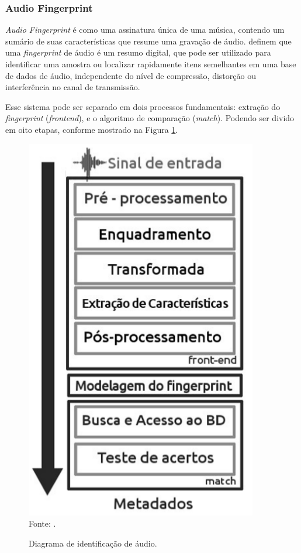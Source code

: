 \subsubsection{Audio Fingerprint} \label{audioFingerprint}
\textit{Audio Fingerprint} é como uma assinatura única de uma música, contendo um sumário de suas características que resume uma gravação de áudio.  definem que uma \textit{fingerprint} de áudio é um resumo digital, que pode ser utilizado para identificar uma amostra ou localizar rapidamente itens semelhantes em uma base de dados de áudio, independente do nível de compressão, distorção ou interferência no canal de transmissão.

Esse sistema pode ser separado em dois processos fundamentais: extração do \textit{fingerprint} (\textit{frontend}), e o algoritmo de comparação (\textit{match}). Podendo ser divido em oito etapas, conforme mostrado na Figura \ref{fig:etapasFinger}.

\begin{figure}[!htb]
   \centering
   \caption{Diagrama de identificação de áudio.}\label{fig:etapasFinger} 
   \includegraphics[scale=0.47]{figuras/etapasFinger.png}
   \\Fonte: \cite{carreira2015}.
\end{figure}

